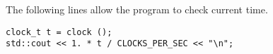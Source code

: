 The following lines allow the program to check current time.
\begin{lstlisting}
clock_t t = clock ();
std::cout << 1. * t / CLOCKS_PER_SEC << "\n";
\end{lstlisting}

